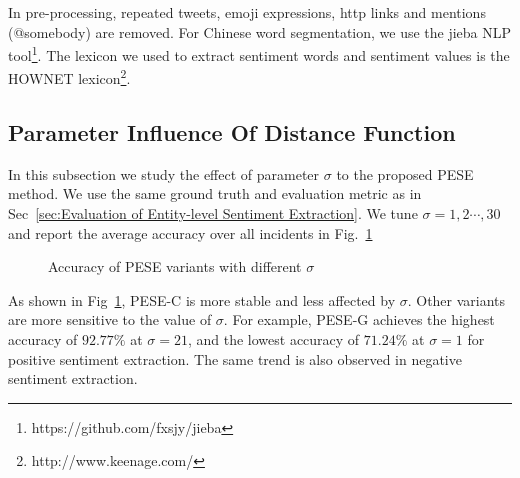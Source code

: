 \documentclass[runningheads]{llncs}
\begin{document}
In pre-processing, repeated tweets, emoji expressions, http links and mentions (@somebody) are removed. For Chinese word segmentation, we use the jieba NLP tool\footnote{https://github.com/fxsjy/jieba}. The lexicon we used to extract sentiment words and sentiment values is the HOWNET lexicon\footnote{http://www.keenage.com/}. 

\subsection{Parameter Influence Of Distance Function}
In this subsection we study the effect of parameter $\sigma$ to the proposed PESE method. We use the same ground truth and evaluation metric as in Sec~\ref{sec:Evaluation of Entity-level Sentiment Extraction}. We tune $\sigma=1,2\cdots,30$ and report the average accuracy over all incidents in Fig.~\ref{fig:sigma}


\begin{figure}
\centering
{}
\hspace{-4ex}
\setlength{\abovecaptionskip}{-0.1cm}
\caption{Accuracy of PESE variants with different $\sigma$}\label{fig:sigma}
\end{figure}

As shown in Fig~\ref{fig:sigma}, PESE-C is more stable and less affected by $\sigma$. Other variants are more sensitive to the value of $\sigma$. For example, PESE-G achieves the highest accuracy of $92.77\%$ at $\sigma=21$, and the lowest accuracy of $71.24\%$ at $\sigma=1$ for positive sentiment extraction. The same trend is also observed in negative sentiment extraction.
\end{document}
